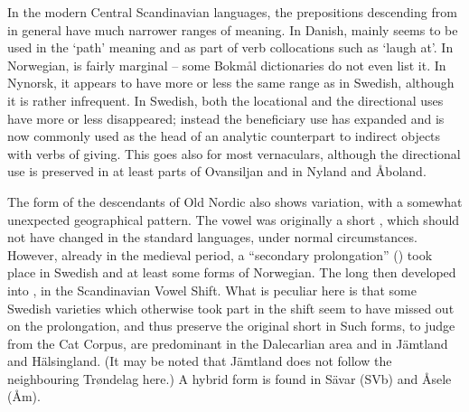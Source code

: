 
\ea\label{}

\z 
\z

In the modern Central Scandinavian languages, the prepositions descending from  in general have much narrower ranges of meaning. In Danish, mainly seems to be used in the ‘path’ meaning and as part of verb collocations such as  ‘laugh at’. In Norwegian,  is fairly marginal – some Bokmål dictionaries do not even list it. In Nynorsk, it appears to have more or less the same range as in Swedish, although it is rather infrequent. In Swedish, both the locational and the directional uses have more or less disappeared; instead the beneficiary use has expanded and is now commonly used as the head of an analytic counterpart to indirect objects with verbs of giving. This goes also for most vernaculars, although the directional use is preserved in at least parts of Ovansiljan and in Nyland and Åboland. 

The form of the descendants of Old Nordic  also shows variation, with a somewhat unexpected geographical pattern. The vowel was originally a short , which should not have changed in the standard languages, under normal circumstances. However, already in the medieval period, a “secondary prolongation” (\citet[1204]{Hellquist1922}) took place in Swedish and at least some forms of Norwegian. The long  then developed into , in the Scandinavian Vowel Shift. What is peculiar here is that some Swedish varieties which otherwise took part in the   shift seem to have missed out on the prolongation, and thus preserve the original short in Such forms, to judge from the Cat Corpus, are predominant in the Dalecarlian area and in Jämtland and Hälsingland. (It may be noted that Jämtland does not follow the neighbouring Trøndelag here.) A hybrid form  is found in Sävar (SVb) and Åsele (Åm). 

